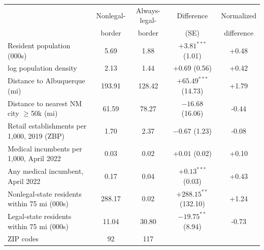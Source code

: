 \begin{tabular}{@{}lcccc@{}}
\toprule
 & Nonlegal- & Always-legal- & Difference & Normalized \\
 & border & border & (SE) & difference \\
\midrule
Resident population (000s) & 5.69 & 1.88 & $+3.81^{***}$ (1.01) & +0.48 \\
log population density & 2.13 & 1.44 & $+0.69$ (0.56) & +0.42 \\
Distance to Albuquerque (mi) & 193.91 & 128.42 & $+65.49^{***}$ (14.73) & +1.79 \\
Distance to nearest NM city $\geq$50k (mi) & 61.59 & 78.27 & $-16.68$ (16.06) & -0.44 \\
Retail establishments per 1,000, 2019 (ZBP) & 1.70 & 2.37 & $-0.67$ (1.23) & -0.08 \\
Medical incumbents per 1,000, April 2022 & 0.03 & 0.02 & $+0.01$ (0.02) & +0.10 \\
Any medical incumbent, April 2022 & 0.17 & 0.04 & $+0.13^{***}$ (0.03) & +0.43 \\
Nonlegal-state residents within 75 mi (000s) & 288.17 & 0.02 & $+288.15^{**}$ (132.10) & +1.24 \\
Legal-state residents within 75 mi (000s) & 11.04 & 30.80 & $-19.75^{**}$ (8.94) & -0.73 \\
\midrule
ZIP codes & 92 & 117 & & \\
\bottomrule
\end{tabular}
